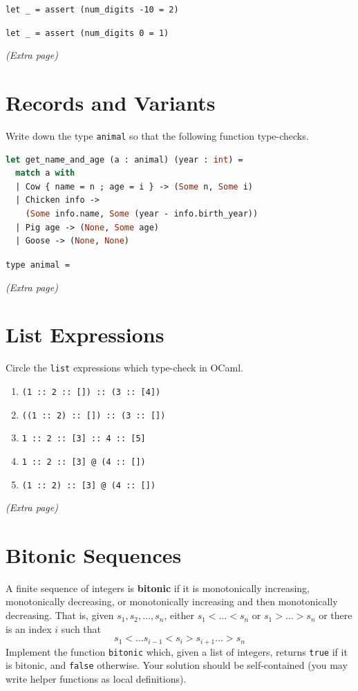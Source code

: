 \documentclass{article}
\theoremstyle{remark} \newtheorem*{solution}{Solution}
\begin{document}
\noindent
\texttt{let \_ = assert (num\_digits -10 = 2)}

\noindent
\texttt{let \_ = assert (num\_digits 0 = 1)}

\pagebreak
\textit{(Extra page)}

\pagebreak
\section{Records and Variants}
Write down the type \texttt{animal} so that the following function type-checks.
\begin{lstlisting}[language=ocaml]
let get_name_and_age (a : animal) (year : int) =
  match a with
  | Cow { name = n ; age = i } -> (Some n, Some i)
  | Chicken info ->
    (Some info.name, Some (year - info.birth_year))
  | Pig age -> (None, Some age)
  | Goose -> (None, None)
\end{lstlisting}
\bigskip

\noindent\texttt{type animal =}

\pagebreak
\textit{(Extra page)}

\pagebreak
\section{List Expressions}
Circle the \texttt{list} expressions which type-check in OCaml.
\begin{enumerate}
\item \texttt{(1 :: 2 :: []) :: (3 :: [4])}
\item \texttt{((1 :: 2) :: []) :: (3 :: [])}
\item \texttt{1 :: 2 :: [3] :: 4 :: [5]}
\item \texttt{1 :: 2 :: [3] @ (4 :: [])}
\item \texttt{(1 :: 2) :: [3] @ (4 :: [])}
\end{enumerate}

\pagebreak
\textit{(Extra page)}

\pagebreak
\section{Bitonic Sequences}

A finite sequence of integers is \textbf{bitonic} if it is monotonically increasing, monotonically decreasing, or monotonically increasing and then monotonically decreasing.
That is, given $s_1, s_2, \dots, s_n$, either $s_1 < \dots < s_n$ or $s_1 > \dots  >s_n$ or there is an index $i$ such that
\begin{displaymath}
  s_1 < \dots s_{i - 1} < s_i > s_{i + 1} \dots > s_n
\end{displaymath}
Implement the function \texttt{bitonic} which, given a list of integers, returns \texttt{true} if it is bitonic, and \texttt{false} otherwise.
Your solution should be self-contained (you may write helper functions as local definitions).
\bigskip
\end{document}
